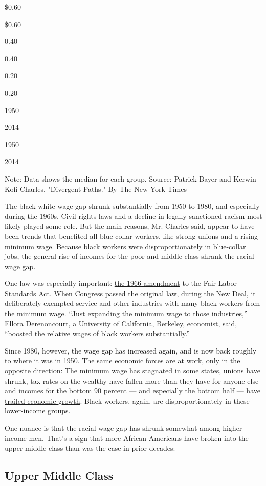 \$0.60

\$0.60

0.40

0.40

0.20

0.20

1950

2014

1950

2014

Note: Data shows the median for each group. Source: Patrick Bayer and
Kerwin Kofi Charles, "Divergent Paths." \textbar{} By The New York Times

The black-white wage gap shrunk substantially from 1950 to 1980, and
especially during the 1960s. Civil-rights laws and a decline in legally
sanctioned racism most likely played some role. But the main reasons,
Mr. Charles said, appear to have been trends that benefited all
blue-collar workers, like strong unions and a rising minimum wage.
Because black workers were disproportionately in blue-collar jobs, the
general rise of incomes for the poor and middle class shrank the racial
wage gap.

One law was especially important:
\href{https://www.law.cornell.edu/cfr/text/29/779.338}{the 1966
amendment} to the Fair Labor Standards Act. When Congress passed the
original law, during the New Deal, it deliberately exempted service and
other industries with many black workers from the minimum wage. ``Just
expanding the minimum wage to those industries,'' Ellora Derenoncourt, a
University of California, Berkeley, economist, said, ``boosted the
relative wages of black workers substantially.''

Since 1980, however, the wage gap has increased again, and is now back
roughly to where it was in 1950. The same economic forces are at work,
only in the opposite direction: The minimum wage has stagnated in some
states, unions have shrunk, tax rates on the wealthy have fallen more
than they have for anyone else and incomes for the bottom 90 percent ---
and especially the bottom half ---
\href{https://www.nytimes.com/2019/02/24/opinion/income-inequality-upper-middle-class.html}{have
trailed economic growth}. Black workers, again, are disproportionately
in these lower-income groups.

One nuance is that the racial wage gap has shrunk somewhat among
higher-income men. That's a sign that more African-Americans have broken
into the upper middle class than was the case in prior decades:

\hypertarget{upper-middle-class}{%
\subsection{Upper Middle Class}\label{upper-middle-class}}


